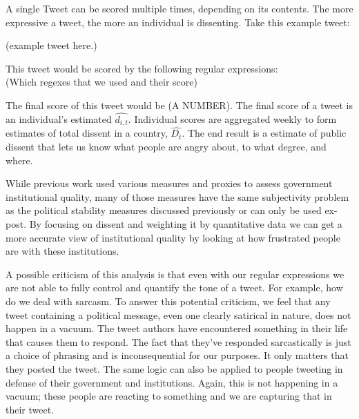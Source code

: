 \documentclass[12pt]{article}
\begin{document}
\begin{spacing}{1.5}
A single Tweet can be scored multiple times, depending on its contents. The more expressive a tweet, the more an individual is dissenting. Take this example tweet: 

\vspace{.5 em}
(example tweet here.)     

\noindent This tweet would be scored by the following regular expressions:
\vspace{.5 em}
\\
(Which regexes that we used and their score)  



The final score of this tweet would be (A NUMBER). The final score of a tweet is an individual's estimated $\hat{d_{i,t}}$. Individual scores are aggregated weekly to form estimates of total dissent in a country, $\hat{D_t}$. The end result is a estimate of public dissent that lets us know what people are angry about, to what degree, and where. 

While previous work used various measures and proxies to assess government institutional quality, many of those measures have the same subjectivity problem as the political stability measures discussed previously or can only be used ex-post. By focusing on dissent and weighting it by quantitative data we can get a more accurate view of institutional quality by looking at how frustrated people are with these institutions. 


A possible criticism of this analysis is that even with our regular expressions we are not able to fully control and quantify the tone of a tweet. For example, how do we deal with sarcasm. To answer this potential criticism, we feel that any tweet containing a political message, even one clearly satirical in nature, does not happen in a vacuum. The tweet authors have encountered something in their life that causes them to respond. The fact that they've responded sarcastically is just a choice of phrasing and is inconsequential for our purposes. It only matters that they posted the tweet. The same logic can also be applied to people tweeting in defense of their government and institutions. Again, this is not happening in a vacuum; these people are reacting to something and we are capturing that in their tweet.   



\end{spacing}
\end{document}
